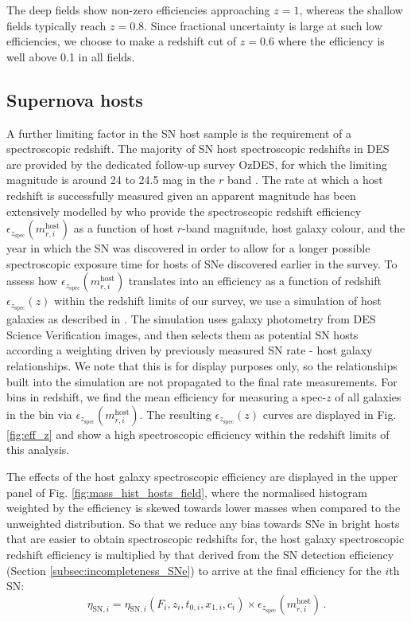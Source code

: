 \documentclass[fleqn,usenatbib]{mnras}
\begin{document}
The deep fields show non-zero efficiencies approaching $z=1$, whereas the shallow fields typically reach $z=0.8$. Since fractional uncertainty is large at such low efficiencies, we choose to make a redshift cut of $z=0.6$ where the efficiency is well above 0.1 in all fields. 

\subsection{Supernova hosts \label{subsec:incompletenss_SN_hosts}}
A further limiting factor in the SN host sample is the requirement of a spectroscopic redshift. The majority of SN host spectroscopic redshifts in DES are provided by the dedicated follow-up survey OzDES, for which the limiting magnitude is around 24 to 24.5 mag in the $r$ band \citep{Lidman2020}. The rate at which a host redshift is successfully measured given an apparent magnitude has been extensively modelled by \citet{Vincenzi2020} who provide the spectroscopic redshift efficiency $\epsilon_{z_{\mathrm{spec}}} (m^{\mathrm{host}}_{r,i})$ as a function of host $r$-band magnitude, host galaxy colour, and the year in which the SN was discovered in order to allow for a longer possible spectroscopic exposure time for hosts of SNe discovered earlier in the survey.  To assess how $\epsilon_{z_{\mathrm{spec}}} (m^{\mathrm{host}}_{r,i})$ translates into an efficiency as a function of redshift $\epsilon_{z_{\mathrm{spec}}} (z)$ within the redshift limits of our survey, we use a simulation of host galaxies as described in \citet{Vincenzi2020}. The simulation uses galaxy photometry from DES Science Verification images, and then selects them as potential SN hosts according a weighting driven by previously measured SN rate - host galaxy relationships. We note that this is for display purposes only, so the relationships built into the simulation are not propagated to the final rate measurements. For bins in redshift, we find the mean efficiency for measuring a spec-$z$ of all galaxies in the bin via $\epsilon_{z_{\mathrm{spec}}} (m^{\mathrm{host}}_{r,i})$. The resulting $\epsilon_{z_{\mathrm{spec}}} (z)$ curves are displayed in Fig. \ref{fig:eff_z} and show a high spectroscopic efficiency within the redshift limits of this analysis.

The effects of the host galaxy spectroscopic efficiency are displayed in the upper panel of Fig. \ref{fig:mass_hist_hosts_field}, where the normalised histogram weighted by the efficiency is skewed towards lower masses when compared to the unweighted distribution. So that we reduce any bias towards SNe in bright hosts that are easier to obtain spectroscopic redshifts for, the host galaxy spectroscopic redshift efficiency is multiplied by that derived from the SN detection efficiency (Section \ref{subsec:incompleteness_SNe}) to arrive at the final efficiency for the $i$th SN:
\begin{equation}
    \eta_{\mathrm{SN},i} = \eta_{\mathrm{SN},i} (F_i,z_i,t_{0,i},x_{1,i},c_i)\times \epsilon_{z_{\mathrm{spec}}} (m^{\mathrm{host}}_{r,i})\,.
\end{equation}
\end{document}
